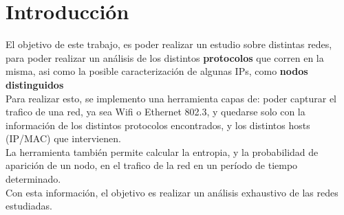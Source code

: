 \section{Introducci\'on}

El objetivo de este trabajo, es poder realizar un estudio sobre distintas redes, para poder realizar un análisis de los distintos \textbf{protocolos} que corren en la misma, asi como la posible caracterización de algunas IPs, como \textbf{nodos distinguidos}\\

Para realizar esto, se implemento una herramienta capas de: poder capturar el trafico de una red, ya sea Wifi o Ethernet 802.3, y quedarse solo con la información de los distintos protocolos encontrados, y los distintos hosts (IP/MAC) que intervienen.\\

La herramienta también permite calcular la entropia, y la probabilidad de aparición de un nodo, en el trafico de la red en un período de tiempo determinado.\\

Con esta información, el objetivo es realizar un análisis exhaustivo de las redes estudiadas.